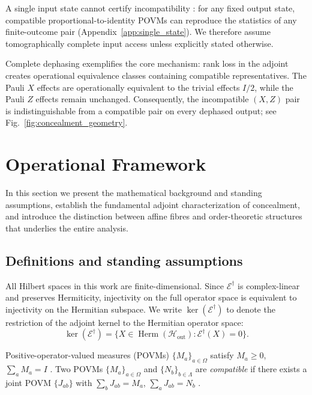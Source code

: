 \documentclass[
aps,pra,twocolumn,10pt,
superscriptaddress,longbibliography,floatfix
]{revtex4-2}
\DeclareMathOperator{\Herm}{Herm}
\begin{document}
A single input state cannot certify incompatibility \cite{Heinosaari2021FewStates}: for any fixed output state, compatible proportional-to-identity POVMs can reproduce the statistics of any finite-outcome pair (Appendix~\ref{app:single_state}). We therefore assume tomographically complete input access unless explicitly stated otherwise.

Complete dephasing exemplifies the core mechanism: rank loss in the adjoint creates operational equivalence classes containing compatible representatives. The Pauli $X$ effects are operationally equivalent to the trivial effects $I/2$, while the Pauli $Z$ effects remain unchanged. Consequently, the incompatible $(X,Z)$ pair is indistinguishable from a compatible pair on every dephased output; see Fig.~\ref{fig:concealment_geometry}.

\section{Operational Framework}
\label{sec:framework}

In this section we present the mathematical background and standing assumptions, establish the fundamental adjoint characterization of concealment, and introduce the distinction between affine fibres and order-theoretic structures that underlies the entire analysis.

\subsection{Definitions and standing assumptions}

All Hilbert spaces in this work are finite-dimensional. Since $\mathcal{E}^\dagger$ is complex-linear and preserves Hermiticity, injectivity on the full operator space is equivalent to injectivity on the Hermitian subspace. We write $\ker(\mathcal E^\dagger)$ to denote the restriction of the adjoint kernel to the Hermitian operator space:
\[
\ker(\mathcal E^\dagger) = \{X \in \Herm(\mathcal H_{\mathrm{out}}) : \mathcal E^\dagger(X)=0\}.
\]

Positive-operator-valued measures (POVMs) $\{M_a\}_{a\in\Omega}$ satisfy $M_a \ge 0$, $\sum_a M_a = I$ \cite{Busch2016,Heinosaari2016,Guhne2023}. Two POVMs $\{M_a\}_{a\in\Omega}$ and $\{N_b\}_{b\in\Lambda}$ are \emph{compatible} if there exists a joint POVM $\{J_{ab}\}$ with $\sum_b J_{ab} = M_a$, $\sum_a J_{ab} = N_b$ \cite{Busch2016,Heinosaari2016,Guhne2023}.
\end{document}
